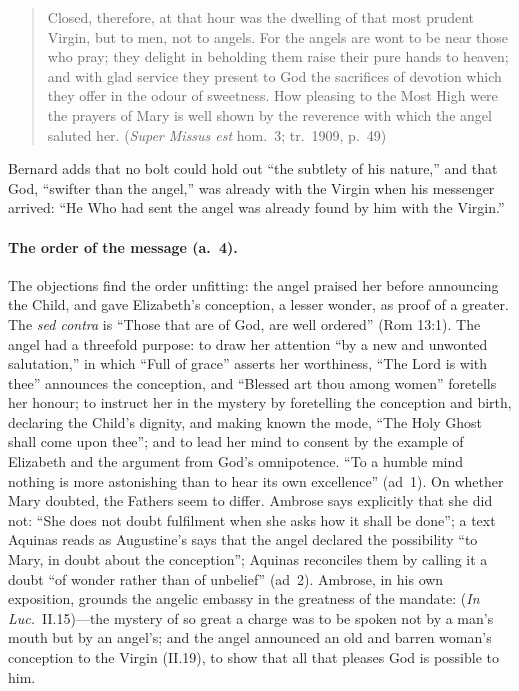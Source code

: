 \begin{quote}
Closed, therefore, at that hour was the dwelling of that most prudent
Virgin, but to men, not to angels. For the angels are wont to be near those
who pray; they delight in beholding them raise their pure hands to heaven;
and with glad service they present to God the sacrifices of devotion which
they offer in the odour of sweetness. How pleasing to the Most High were
the prayers of Mary is well shown by the reverence with which the angel
saluted her. (\emph{Super Missus est} hom.~3; tr.\ 1909, p.~49)
\end{quote}

\noindent Bernard adds that no bolt could hold out ``the subtlety of his
nature,'' and that God, ``swifter than the angel,'' was already with the
Virgin when his messenger arrived: ``He Who had sent the angel was already
found by him with the Virgin.''

\paragraph{The order of the message (a.~4).} The objections find the order
unfitting: the angel praised her before announcing the Child, and gave
Elizabeth's conception, a lesser wonder, as proof of a greater. The
\emph{sed contra} is ``Those that are of God, are well ordered'' (Rom 13:1).
The angel had a threefold purpose: to draw her attention ``by a new and
unwonted salutation,'' in which ``Full of grace'' asserts her worthiness,
``The Lord is with thee'' announces the conception, and ``Blessed art thou
among women'' foretells her honour; to instruct her in the mystery by
foretelling the conception and birth, declaring the Child's dignity, and
making known the mode, ``The Holy Ghost shall come upon thee''; and to lead
her mind to consent by the example of Elizabeth and the argument from God's
omnipotence. ``To a humble mind nothing is more astonishing than to hear its
own excellence'' (ad~1). On whether Mary doubted, the Fathers seem to
differ. Ambrose says explicitly that she did not: ``She does not
doubt fulfilment when she asks how it shall be done''; a text Aquinas reads
as Augustine's says that the angel declared the possibility ``to Mary, in
doubt about the conception''; Aquinas reconciles them by calling it a doubt ``of wonder rather than of unbelief'' (ad~2). Ambrose, in his own
exposition, grounds the angelic embassy in the greatness of the mandate:
 (\emph{In Luc.}\ II.15)---the mystery of so great a charge was to
be spoken not by a man's mouth but by an angel's; and the angel announced an
old and barren woman's conception to the Virgin  (II.19), to show that all that pleases
God is possible to him.

